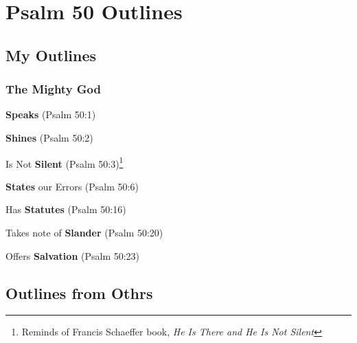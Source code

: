 \section{Psalm 50 Outlines}

\subsection{My Outlines}

\subsubsection{The Mighty God}

\begin{compactenum}[I.]
    \item \textbf{Speaks}  (Psalm 50:1)
    \item \textbf{Shines}  (Psalm 50:2)
    \item Is Not \textbf{Silent}  (Psalm 50:3)\footnote{Reminds of Francis Schaeffer book, \emph{He Is There and He Is Not Silent} }
    \item \textbf{States} our Errors  (Psalm 50:6)
    \item Has \textbf{Statutes}  (Psalm 50:16)
    \item Takes note of \textbf{Slander}  (Psalm 50:20)
    \item Offers \textbf{Salvation}  (Psalm 50:23)
\end{compactenum}

\subsection{Outlines from Othrs}


